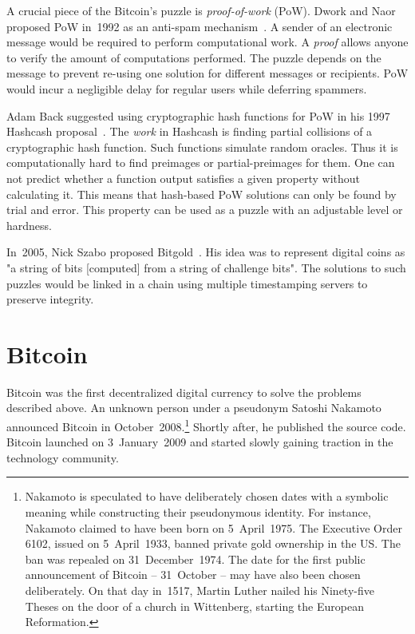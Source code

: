 A crucial piece of the Bitcoin's puzzle is \textit{proof-of-work} (PoW).
Dwork and Naor proposed PoW in~1992 as an anti-spam mechanism~\cite{Dwork1992}.
A sender of an electronic message would be required to perform computational work.
A \textit{proof} allows anyone to verify the amount of computations performed.
The puzzle depends on the message to prevent re-using one solution for different messages or recipients.
PoW would incur a negligible delay for regular users while deferring spammers.

Adam Back suggested using cryptographic hash functions for PoW in his 1997 Hashcash proposal~\cite{Back1997}.
The \textit{work} in Hashcash is finding partial collisions of a cryptographic hash function.
Such functions simulate random oracles.
Thus it is computationally hard to find preimages or partial-preimages for them.
One can not predict whether a function output satisfies a given property without calculating it.
This means that hash-based PoW solutions can only be found by trial and error.
This property can be used as a puzzle with an adjustable level or hardness.

In~2005, Nick Szabo proposed Bitgold~\cite{Szabo2005}.
His idea was to represent digital coins as "a string of bits [computed] from a string of challenge bits".
The solutions to such puzzles would be linked in a chain using multiple timestamping servers to preserve integrity.


\section{Bitcoin}

Bitcoin was the first decentralized digital currency to solve the problems described above.
An unknown person under a pseudonym Satoshi Nakamoto announced Bitcoin in October~2008.\footnote{Nakamoto is speculated to have deliberately chosen dates with a symbolic meaning while constructing their pseudonymous identity. For instance, Nakamoto claimed to have been born on 5~April~1975. The Executive Order 6102, issued on 5~April~1933, banned private gold ownership in the US. The ban was repealed on 31~December~1974. The date for the first public announcement of Bitcoin -- 31~October -- may have also been chosen deliberately. On that day in~1517, Martin Luther nailed his Ninety-five Theses on the door of a church in Wittenberg, starting the European Reformation.}
Shortly after, he published the source code.
Bitcoin launched on 3~January~2009 and started slowly gaining traction in the technology community.

